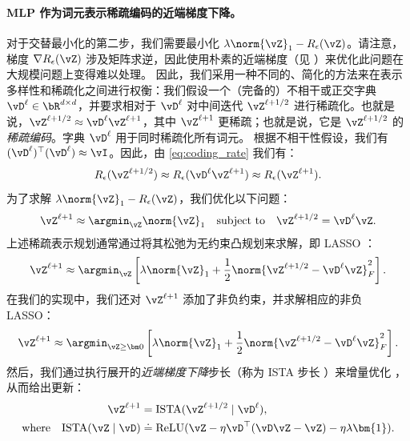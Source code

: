 \documentclass[../../book-main_zh.tex]{subfiles}
\begin{document}
\paragraph{MLP 作为词元表示稀疏编码的近端梯度下降。} 对于交替最小化的第二步，我们需要最小化 $\lambda \norm{\vZ}_{1} - R_{\epsilon}(\vZ)$。请注意，梯度 \(\nabla R_{\epsilon}(\vZ)\) 涉及矩阵求逆，因此使用朴素的近端梯度（见 ）来优化此问题在大规模问题上变得难以处理。 %
因此，我们采用一种不同的、简化的方法来在表示多样性和稀疏化之间进行权衡：我们假设一个（完备的）不相干或正交字典 $\vD^{\ell} \in \bR^{d \times d}$，并要求相对于 \(\vD^{\ell}\) 对中间迭代 $\vZ^{\ell + 1/2}$ 进行稀疏化。也就是说，$\vZ^{\ell + 1/2} \approx \vD^{\ell} \vZ^{\ell + 1}$，其中 $\vZ^{\ell + 1}$ 更稀疏；也就是说，它是 \(\vZ^{\ell + 1/2}\) 的\textit{稀疏编码}。字典 \(\vD^{\ell}\) 用于同时稀疏化所有词元。
根据不相干性假设，我们有 $(\vD^{\ell})^\top(\vD^{\ell}) \approx \vI$。因此，由 \eqref{eq:coding_rate} 我们有：
\begin{equation}
    R_{\epsilon}(\vZ^{\ell + 1/2}) \approx
    R_{\epsilon}(\vD^{\ell}\vZ^{\ell + 1}) \approx R_{\epsilon}(\vZ^{\ell + 1}).
\end{equation}
为了求解 $\lambda \norm{\vZ}_{1} - R_{\epsilon}(\vZ)$，我们优化以下问题：
\begin{align*}
    \vZ^{\ell + 1} \approx \argmin_{\vZ}  \norm{\vZ}_1 \quad
    \mbox{subject to} \quad \vZ^{\ell + 1/2} = \vD^{\ell}\vZ.
\end{align*}
{上述稀疏表示规划通常通过将其松弛为无约束凸规划来求解，即 LASSO \citep{Wright-Ma-2022}：}
\begin{equation}
    \vZ^{\ell + 1} \approx \argmin_{\vZ} \left[\lambda \norm{\vZ}_1 +
    \frac{1}{2}\norm{\vZ^{\ell + 1/2} - \vD^{\ell} \vZ}_F^2 \right].
\end{equation}
在我们的实现中，我们还对 $\vZ^{\ell + 1}$ 添加了非负约束，并求解相应的非负 LASSO：
\begin{equation}
    \vZ^{\ell + 1} \approx \argmin_{\vZ \geq \bm 0}
    \left[\lambda\norm{\vZ}_1 + \frac{1}{2}\norm{\vZ^{\ell + 1/2} -
    \vD^{\ell} \vZ}_{F}^{2}\right].
    \label{eq:sparse-nonnegative}
\end{equation}
然后，我们通过执行展开的{\em 近端梯度下降}步长（称为 ISTA 步长 \citep{beck2009fast}）来增量优化 ，从而给出更新：
\begin{align}\label{eq:ista-block}
    \vZ^{\ell + 1}
    &= \mathrm{ISTA}({\vZ^{\ell + 1/2} \mid \vD^{\ell}}), \\
    \text{where} \quad \mathrm{ISTA}({\vZ \mid \vD})
    &\doteq \operatorname{ReLU}(\vZ - \eta \vD^\top(\vD\vZ - \vZ) -
    \eta \lambda \bm{1}).
\end{align}
\end{document}
